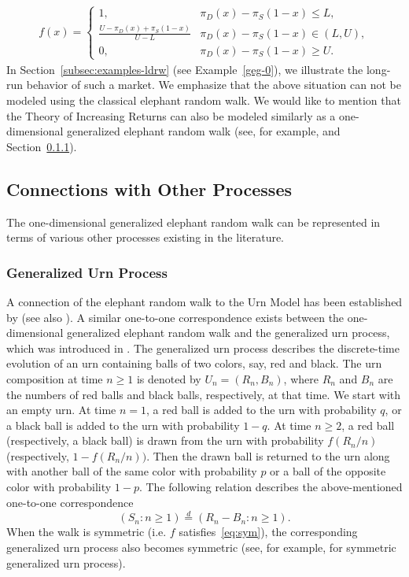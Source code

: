 \documentclass[12pt]{amsart}
\theoremstyle{plain}
\theoremstyle{remark}
\numberwithin{equation}{section}
\begin{document}
\begin{align*}
       f(x) = \begin{cases}
       1, & \pi_D(x) - \pi_S(1-x) \leq L, \\
       \frac{U - \pi_D(x) + \pi_S(1-x)}{U - L} & \pi_D(x) - \pi_S(1-x) \in (L,U), \\
       0, & \pi_D(x) - \pi_S(1-x) \geq U.
       \end{cases}
\end{align*}
In Section~\ref{subsec:examples-ldrw} (see Example~\ref{geg-0}), we illustrate the long-run behavior of such a market. We emphasize that the above situation can not be modeled using the classical elephant random walk. {We would like to mention that the Theory of Increasing Returns can also be modeled similarly as a one-dimensional generalized elephant random walk (see, for example, \cite{franchini} and Section~\ref{sss:urn}).} %

\subsection{Connections with Other Processes}\label{subsec:connection}

The one-dimensional generalized elephant random walk can be represented in terms of various other processes existing in the literature. 

\subsubsection{Generalized Urn Process}\label{sss:urn}

A connection of the elephant random walk to the Urn Model has been established by \cite{baur2016elephant} (see also \cite{MR2413290}). A similar one-to-one correspondence exists between the one-dimensional generalized elephant random walk and the generalized urn process, which was introduced in \cite{hill1980strong}. The generalized urn process describes the discrete-time evolution of an urn containing balls of two colors, say, red and black. The urn composition at time $n \geq 1$ is denoted by $U_n = (R_n, B_n)$, where $R_n$ and $B_n$ are the numbers of red balls and black balls, respectively, at that time. We start with an empty urn. At time $n=1$, a red ball is added to the urn with probability $q$, or a black ball is added to the urn with probability $1 - q$. At time $n \geq 2$, a red ball (respectively, a black ball) is drawn from the urn with probability $f(R_n/n)$ (respectively, $1 - f(R_n/n))$. Then the drawn ball is returned to the urn along with another ball of the same color with probability $p$ or a ball of the opposite color with probability $1 - p$. The following relation describes the above-mentioned one-to-one correspondence \[(S_n : n \geq 1) \stackrel{d}{=} (R_n - B_n : n \geq 1).\]
{When the walk is symmetric (i.e. $f$ satisfies~\eqref{eq:sym}), the corresponding generalized urn process also becomes symmetric (see, for example, \cite{sym} for symmetric generalized urn process).} 
\end{document}
